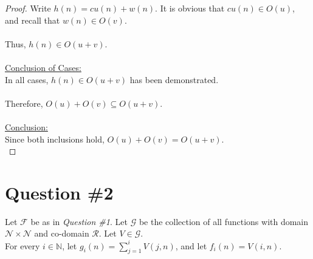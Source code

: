\documentclass[12pt]{article}
\begin{document}
\begin{proof}
    Write \( h(n) = cu(n) + w(n) \). It is obvious that \( cu(n) \in O(u) \), and recall that \( w(n) \in O(v) \). \\
    \\
    Thus, \( h(n) \in O(u + v) \). \\
    \\
    \underline{Conclusion of Cases:} \\
    In all cases, \( h(n) \in O(u + v) \) has been demonstrated. \\
    \\
    Therefore, \( O(u) + O(v) \subseteq O(u + v) \). \\
    \\
    \underline{Conclusion:} \\
    Since both inclusions hold, \( O(u) + O(v) = O(u + v) \). \\
\end{proof}
\pagebreak

\section*{Question \#2}
Let \( \mathcal{F} \) be as in \textit{Question \#1}. Let \( \mathcal{G} \) be the collection of all functions with domain \( \mathcal{N} \times \mathcal{N} \) and co-domain \( \mathcal{R} \). Let \( V \in \mathcal{G} \). \\
For every \( i \in \mathbb{N} \), let \( g_i(n) = \sum_{j=1}^{i} V(j, n) \), and let \( f_i(n) = V(i, n) \).
\end{document}
